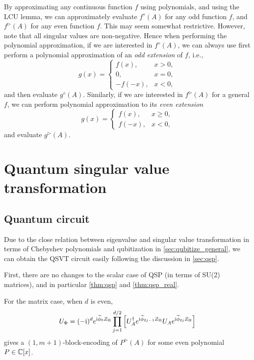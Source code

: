\begin{rem}
By approximating any continuous function $f$ using polynomials, and using the LCU lemma, we can approximately evaluate $f^{\diamond}(A)$ for any odd function $f$, and $f^{\triangleright}(A)$ for any even function $f$.
This may seem somewhat restrictive.
However, note that all singular values are non-negative.
Hence when performing the polynomial approximation, if we are interested in $f^{\diamond}(A)$, we can always use first perform a polynomial approximation of an \emph{odd extension} of $f$, i.e.,
\begin{equation}
g(x)=\begin{cases}
f(x), & x>0,\\
0, & x=0, \\
-f(-x), & x<0,
\end{cases}
\end{equation}
and then evaluate $g^{\diamond}(A)$.
Similarly, if we are interested in $f^{\triangleright}(A)$ for a general $f$, we can perform polynomial approximation to its \emph{even extension}
\begin{equation}
g(x)=\begin{cases}
f(x), & x\ge0,\\
f(-x), & x<0,
\end{cases}
\end{equation}
and evaluate $g^{\triangleright}(A)$.
\end{rem}

\section{Quantum singular value transformation}\label{sec:qsvt}

\subsection{Quantum circuit}

Due to the close relation between eigenvalue and singular value transformation in terms of Chebyshev polynomials and qubitization in \cref{sec:qubitize_general}, we can obtain the QSVT circuit easily following the discussion in \cref{sec:qsp}.


First, there are no changes to the scalar case of QSP (in terms of SU(2) matrices), and in particular \cref{thm:qsp} and \cref{thm:qsp_real}.

For the matrix case, when $d$ is even,
\begin{equation}
U_{\Phi}=(-\mathrm{i})^d e^{\mathrm{i} \widetilde{\phi}_0 Z_{\Pi}} 
\prod_{j=1}^{d/2}\left[ U^{\dag}_A e^{\mathrm{i} \widetilde{\phi}_{2j-1} Z_{\Pi}}U_A e^{\mathrm{i} \widetilde{\phi}_{2j} Z_{\Pi}} \right]
\end{equation}
gives a $(1,m+1)$-block-encoding of $P^{\triangleright}(A)$ for some even polynomial $P\in\mathbb{C}[x]$.

